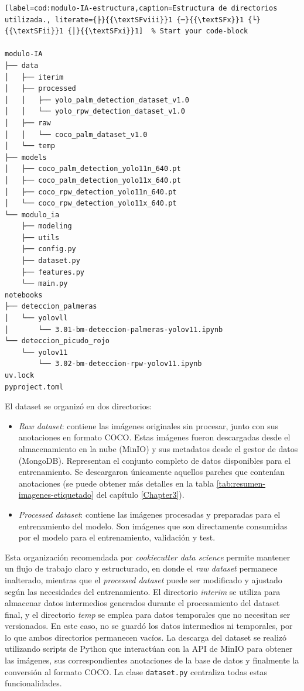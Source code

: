\begin{lstlisting}[label=cod:modulo-IA-estructura,caption=Estructura de directorios utilizada., literate={├}{{\textSFviii}}1 {─}{{\textSFx}}1 {└}{{\textSFii}}1 {│}{{\textSFxi}}1]  % Start your code-block

modulo-IA
├── data
│   ├── iterim
│   ├── processed
│   │   ├── yolo_palm_detection_dataset_v1.0
│   │   └── yolo_rpw_detection_dataset_v1.0
│   ├── raw
│   │   └── coco_palm_dataset_v1.0
│   └── temp
├── models
│   ├── coco_palm_detection_yolo11n_640.pt
│   ├── coco_palm_detection_yolo11x_640.pt
│   ├── coco_rpw_detection_yolo11n_640.pt
│   └── coco_rpw_detection_yolo11x_640.pt
└── modulo_ia
    ├── modeling
    ├── utils
    ├── config.py
    ├── dataset.py
    ├── features.py
    └── main.py
notebooks
├── deteccion_palmeras
│   └── yolovll
│       └── 3.01-bm-deteccion-palmeras-yolov11.ipynb
└── deteccion_picudo_rojo
    └── yolov11
        └── 3.02-bm-deteccion-rpw-yolov11.ipynb
uv.lock
pyproject.toml

\end{lstlisting}

El dataset se organizó en dos directorios:
\begin{itemize}
    \item \textit{Raw dataset}: contiene las imágenes originales sin procesar, junto con sus anotaciones en formato COCO. Estas imágenes fueron descargadas desde el almacenamiento en la nube (MinIO) y sus metadatos desde el gestor de datos (MongoDB). Representan el conjunto completo de datos disponibles para el entrenamiento. Se descargaron únicamente aquellos parches que contenían anotaciones (se puede obtener más detalles en la tabla \ref{tab:resumen-imagenes-etiquetado} del capítulo \ref{Chapter3}).
    \item \textit{Processed dataset}: contiene las imágenes procesadas y preparadas para el entrenamiento del modelo. Son imágenes que son directamente consumidas por el modelo para el entrenamiento, validación y test.
\end{itemize}

Esta organización recomendada por \textit{cookiecutter data science} permite mantener un flujo de trabajo claro y estructurado, en donde el \textit{raw dataset} permanece inalterado, mientras que el \textit{processed dataset} puede ser modificado y ajustado según las necesidades del entrenamiento. El directorio \textit{interim} se utiliza para almacenar datos intermedios generados durante el procesamiento del dataset final, y el directorio \textit{temp} se emplea para datos temporales que no necesitan ser versionados. En este caso, no se guardó los datos intermedios ni temporales, por lo que ambos directorios permanecen vacíos. La descarga del dataset se realizó utilizando scripts de Python que interactúan con la API de MinIO para obtener las imágenes, sus correspondientes anotaciones de la base de datos y finalmente la conversión al formato COCO. La clase \lstinline[language=sh]|dataset.py| centraliza todas estas funcionalidades.

